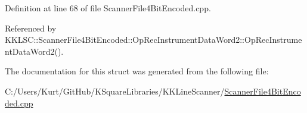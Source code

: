 Definition at line 68 of file Scanner\+File4\+Bit\+Encoded.\+cpp.



Referenced by K\+K\+L\+S\+C\+::\+Scanner\+File4\+Bit\+Encoded\+::\+Op\+Rec\+Instrument\+Data\+Word2\+::\+Op\+Rec\+Instrument\+Data\+Word2().



The documentation for this struct was generated from the following file\+:\begin{DoxyCompactItemize}
\item 
C\+:/\+Users/\+Kurt/\+Git\+Hub/\+K\+Square\+Libraries/\+K\+K\+Line\+Scanner/\hyperlink{_scanner_file4_bit_encoded_8cpp}{Scanner\+File4\+Bit\+Encoded.\+cpp}\end{DoxyCompactItemize}
